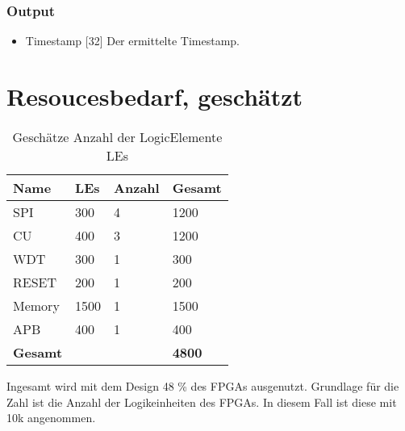 \subsubsection{Output}
\begin{itemize}
\item Timestamp [32] Der ermittelte Timestamp.
\end{itemize}
\section{Resoucesbedarf, geschätzt}
\begin{table}[H]
\caption{Geschätze Anzahl der LogicElemente LEs}
\begin{tabular}{| l | l | l | l |}  \hline 
\textbf{Name} & \textbf{LEs} & \textbf{Anzahl} &\textbf{Gesamt} \\ \hline
SPI & 300 & 4 & 1200 \\ \hline
CU & 400 & 3 & 1200 \\ \hline 
WDT & 300 & 1 & 300 \\ \hline
RESET & 200 & 1 & 200 \\ \hline
Memory & 1500 & 1 & 1500 \\ \hline
APB & 400 & 1 & 400 \\ \hline 
\textbf{Gesamt} & & &  \textbf{4800} \\ \hline
\end{tabular}
\end{table}
Ingesamt wird mit dem Design 48 \% des FPGAs ausgenutzt. Grundlage für die Zahl ist die Anzahl der Logikeinheiten des FPGAs. In diesem Fall ist diese mit 10k angenommen. 